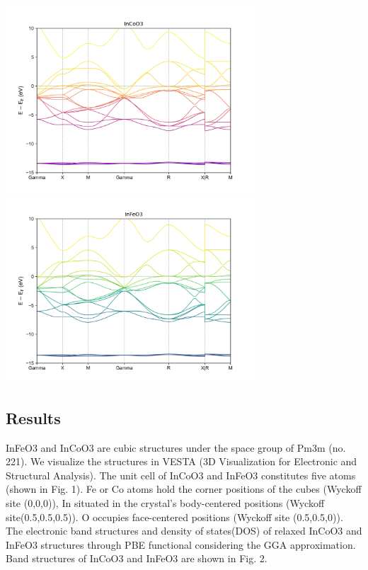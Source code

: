 \documentclass[12pt, letterpaper]{article}
\newcommand*{\1}{\hspace{1pt}}
\begin{document}

    \begin{adjustbox}{center,caption={Band Structure Of InCoO3 and InFeO3},label={somelabel},nofloat=figure,vspace=\bigskipamount}
        \includegraphics[width=0.7\textwidth]{bandCo}
        \includegraphics[width=0.7\textwidth]{bandFe}
    \end{adjustbox}

    \subsection*{Results}
    InFeO3 and InCoO3 are cubic structures under the space group of Pm3m (no. 221). We visualize the structures in VESTA (3D Visualization for Electronic and 
    Structural Analysis). The unit cell of InCoO3 and InFeO3 constitutes five atoms (shown in Fig. 1). Fe or Co atoms hold the corner positions of the cubes (Wyckoff 
    site (0,0,0)), In situated in the crystal's body-centered positions (Wyckoff site(0.5,0.5,0.5)). O occupies face-centered positions (Wyckoff site (0.5,0.5,0)). 
    The electronic band structures and density of states(DOS) of relaxed InCoO3 and InFeO3 structures through PBE functional considering the GGA approximation. 
    Band structures of InCoO3 and InFeO3 are shown in Fig. 2.  
\end{document}
